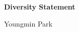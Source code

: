 \documentclass[a4paper,11pt]{article}
\begin{document}





\newpage
\begin{center}
	\Large \textbf{Diversity Statement}
	
	\Large Youngmin Park
\end{center}
\end{document}
